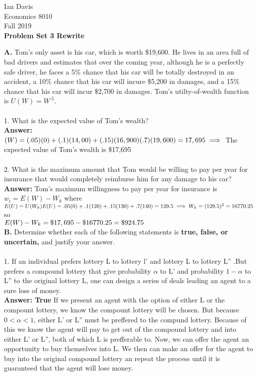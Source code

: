 \documentclass[11pt]{article}
\begin{document}
\begin{flushleft}
Ian Davis\\
Economics 8010\\
Fall 2019\\
\bigskip
\textbf{Problem Set 3 Rewrite}\\
\end{flushleft}
\textbf{A. } Tom's only asset is his car, which is worth \$19,600. He lives in an area full of bad drivers and estimates that over the coming year, although he is a perfectly safe driver, he faces a 5\% chance that his car will be totally destroyed in an accident, a 10\% chance that his car will incure \$5,200 in damages, and a 15\% chance that his car will incur \$2,700 in damages. Tom's utilty-of-wealth function is $U(W)=W^.5$.\\
\\
1. What is the expected value of Tom's wealth?\\
\textbf{Answer: }$(W) = (.05)(0) + (.1)(14,00) + (.15)(16,900) (.7)(19,600) = 17,695\\
\implies$ The expected value of Tom's wealth is \$17,695\\
\\
2. What is the maximum amount that Tom would be willing to pay per year for insurance that would completely reimburse him for any damage to his car?\\
\textbf{Answer: }Tom's maximum willingness to pay per year for insurance is $w_i = E(W) - W_k$ where $E(U) = U(W_k)\\
E(U) = .05(0) + .1(120) + .15(130) + .7(140) = 129.5\\
\implies W_k = (129.5)^2 = 16770.25$\\
so\\
$E(W) - W_k = \$17,695 - \$16770.25 = \$924.75\\$
\\
\textbf{B. } Determine whether each of the following statements is \textbf{true, false, or uncertain,} and justify your answer.\\
\\
1. If an individual prefers lottery L to lottery l' and lottery L to lottery L'' .But prefers a compound lottery that give probability $\alpha$ to L' and probability $1 - \alpha$ to L'' to the original lottery L, one can design a series of deals leading an agent to a sure loss of money.\\
\textbf{Answer: True} If we present an agent with the option of either L or the compount lottery, we know the compount lottery will be chosen. But because $0 < \alpha < 1$, either L' or L'' must be preffered to the compund lottery. Because of this we know the agent will pay to get out of the compound lottery and into either L' or L'', both of which L is prefferable to. Now, we can offer the agent an opportunity to buy themselves into L. We then can make an offer for the agent to buy into the original compound lottery an repeat the process until it is guaranteed that the agent will lose money.\\
\end{document}
